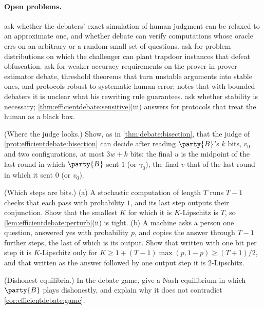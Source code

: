 \begin{refsection}
\paragraph{Open problems.} \Textcite{BrownCohenEtAl2024} ask whether the debaters' exact simulation of human judgment can be relaxed to an approximate one, and whether debate can verify computations whose oracle errs on an arbitrary or a random small set of questions. \Textcite{BrownCohenIrving2024} ask for problem distributions on which the challenger can plant trapdoor instances that defeat obfuscation. \Textcite{HiltonEtAl2025} ask for weaker accuracy requirements on the prover in prover--estimator debate, threshold theorems that turn unstable arguments into stable ones, and protocols robust to systematic human error; \textcite{Irving2025} notes that with bounded debaters it is unclear what his rewriting rule guarantees. \Textcite{BrownCohenEtAl2026} ask whether stability is necessary; \cref{thm:efficientdebate:sensitive}(iii) answers for protocols that treat the human as a black box.

\begin{exercises}
\item \consolidation (Where the judge looks.) Show, as in \cref{thm:debate:bisection}, that the judge of \cref{prot:efficientdebate:bisection} can decide after reading $\party{B}$'s $k$ bits, $v_0$ and two configurations, at most $3w+k$ bits: the final $u$ is the midpoint of the last round in which $\party{B}$ sent $1$ (or $\gamma_0$), the final $v$ that of the last round in which it sent $0$ (or $v_0$).\label{ex:efficientdebate:selective}

\item \consolidation (Which steps are bits.) (a) A stochastic computation of length $T$ runs $T-1$ checks that each pass with probability $1$, and its last step outputs their conjunction. Show that the smallest $K$ for which it is $K$-Lipschitz is $T$, so \cref{lem:efficientdebate:perturb}(ii) is tight. (b) A machine asks a person one question, answered yes with probability $p$, and copies the answer through $T-1$ further steps, the last of which is its output. Show that written with one bit per step it is $K$-Lipschitz only for $K\ge1+(T-1)\max(p,1-p)\ge(T+1)/2$, and that written as the answer followed by one output step it is $2$-Lipschitz.\label{ex:efficientdebate:bits}

\item \consolidation (Dishonest equilibria.) In the debate game, give a Nash equilibrium in which $\party{B}$ plays dishonestly, and explain why it does not contradict \cref{cor:efficientdebate:game}.\label{ex:efficientdebate:equilibria}


\end{exercises}
\end{refsection}

